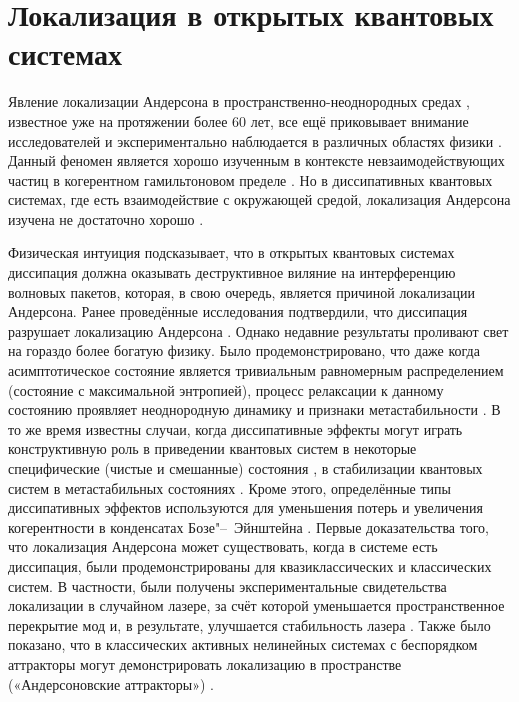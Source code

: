 \chapter{Локализация в открытых квантовых системах}\label{ch:ch2}

Явление локализации Андерсона в пространственно-неоднородных средах \autocite{Anderson1958}, известное уже на протяжении более 60 лет, все ещё приковывает внимание исследователей \autocite{Kramer1993, Evers2008, Esposito2012} и экспериментально наблюдается в различных областях физики \cite{Segev2013, Billy2008, Roati2008, Kondov2011, Jendrzejewski2012}.
Данный феномен является хорошо изученным в контексте невзаимодействующих частиц в когерентном гамильтоновом пределе \autocite{Segev2013, Billy2008, Roati2008, Yedjour2010, Kondov2011, Jendrzejewski2012}.
Но в диссипативных квантовых системах, где есть взаимодействие с окружающей средой, локализация Андерсона изучена не достаточно хорошо \autocite{Breuer2007}.

Физическая интуиция подсказывает, что в открытых квантовых системах диссипация должна оказывать деструктивное виляние на интерференцию волновых пакетов, которая, в свою очередь, является причиной локализации Андерсона.
Ранее проведённые исследования подтвердили, что диссипация разрушает локализацию Андерсона \cite{Gurvitz2000, Nowak2012, Flores1999}. 
Однако недавние результаты проливают свет на гораздо более богатую физику. 
Было продемонстрировано, что даже когда асимптотическое состояние является тривиальным равномерным распределением (состояние с максимальной энтропией), процесс релаксации к данному состоянию проявляет неоднородную динамику и признаки метастабильности \cite{Genway2014}.
В то же время известны случаи, когда диссипативные эффекты могут играть конструктивную роль в приведении квантовых систем в некоторые специфические (чистые и смешанные) состояния \cite{Diehl2008, Kraus2008, Verstraete2009}, в стабилизации квантовых систем в метастабильных состояниях \cite{Valenti2015, Spagnolo2015, Spagnolo2016, Magazz2015, Magazz2016}.
Кроме этого, определённые типы диссипативных эффектов используются для уменьшения потерь и увеличения когерентности в конденсатах Бозе"--~Эйнштейна \cite{Syassen2008, Witthaut2008, Witthaut2011, Kordas2013}.
Первые доказательства того, что локализация Андерсона может существовать, когда в системе есть диссипация, были продемонстрированы для квазиклассических и классических систем. 
В частности, были получены экспериментальные свидетельства локализации в случайном лазере, за счёт которой уменьшается пространственное перекрытие мод и, в результате, улучшается стабильность лазера \autocite{Stano2012, Liu2014}.
Также было показано, что в классических активных нелинейных системах с беспорядком аттракторы могут демонстрировать локализацию в пространстве («Андерсоновские аттракторы») \cite{Laptyeva2015_1, Laptyeva2015_2}. 

